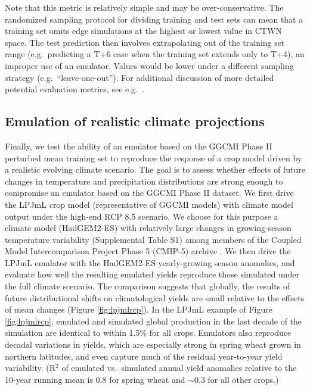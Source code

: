 \documentclass[gmdd]{copernicus} %
\begin{document}
Note that this metric is relatively simple and may be over-conservative.
The randomized sampling protocol for dividing training and test sets can mean that a training set omits edge simulations at the highest or lowest value in CTWN space. 
The test prediction then involves extrapolating out of the training set range (e.g.\ predicting a T+6 case when the training set extends only to T+4), an improper use of an emulator. 
Values would be lower under a different sampling strategy (e.g.\ ``leave-one-out''). 
For additional discussion of more detailed potential evaluation metrics, see e.g.\ \citet{Castruccio14}.

\smallskip
\label{S:4.3}
\subsection{Emulation of realistic climate projections}
Finally, we test the ability of an emulator based on the GGCMI Phase II perturbed mean training set to reproduce the response of a crop model driven by a realistic evolving climate scenario. The goal is to assess whether effects of future changes in temperature and precipitation distributions  are strong enough to compromise an emulator based on the GGCMI Phase II dataset.
We first drive the LPJmL crop model (representative of GGCMI  models) with climate model output under the high-end RCP 8.5 scenario.
We choose for this purpose a climate model (HadGEM2-ES) with relatively large changes in growing-season temperature variability (Supplemental Table S1) among members of the Coupled Model Intercomparison Project Phase 5 (CMIP-5) archive \citep{Jones2011h, Martin2011, Taylor2012}. 
We then drive the LPJmL emulator with the HadGEM2-ES yearly-growing season anomalies, and evaluate how well the resulting emulated yields reproduce those simulated under the full climate scenario. 
The comparison suggests that globally, the results of future distributional shifts on climatological yields are small relative to the effects of mean changes (Figure \ref{fig:lpjmlrcp}). 
In the LPJmL example of Figure \ref{fig:lpjmlrcp}, emulated and simulated global production in the last decade of the simulation are identical to within 1.5\% for all crops.
Emulators also reproduce decadal variations in yields, which are especially strong in spring wheat grown in northern latitudes, and even capture much of the residual year-to-year yield variability. (R$^2$ of emulated vs.\ simulated annual yield anomalies relative to the 10-year running mean is 0.8 for spring wheat and $\sim$0.3 for all other crops.)
\end{document}

